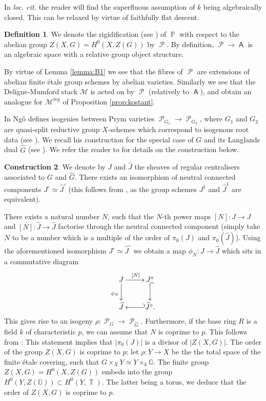 \documentclass{article}
\DeclareMathOperator{\reg}{reg}
\DeclareMathOperator{\A}{\mathsf{A}}
\newcommand{\Gb}{\mathbb{G}}
\DeclareMathOperator{\Pb}{\mathbb{P}}
\DeclareMathOperator{\Tb}{\mathbb{T}}
\newcommand{\Mc}{\mathcal{M}}
\DeclareMathOperator{\Pc}{\mathcal{P}}
\theoremstyle{definition}
\newtheorem{definition}{Definition}[section]
\newtheorem{construction}[definition]{Construction}
\theoremstyle{plain}
\begin{document}
In \emph{loc. cit.} the reader will find the superfluous assumption of $k$ being algebraically closed. This can be relaxed by virtue of faithfully flat descent.

\begin{definition}\label{defi:Pc}
We denote the rigidification (see \cite[Theorem 5.1.5]{abramovich2003twisted}) of $\Pb$ with respect to the abelian group $Z(X,G)=H^0(X,Z(G))$ by $\Pc$. By definition, $\Pc \to \A$ is an algebraic space with a relative group object structure.
\end{definition}

By virtue of Lemma \ref{lemma:B1} we see that the fibres of $\Pc$ are extensions of abelian finite \'etale group schemes by abelian varieties. Similarly we see that the Deligne-Mumford stack $\Mc$ is acted on by $\Pc$ (relatively to $\A$), and obtain an analogue for $\Mc^{\reg}$ of Proposition \ref{prop:kostant}.

In \cite[Proposition 4.18.1]{MR2653248} Ng\^o defines isogenies between Prym varieties $\Pc_{G_1} \to \Pc_{G_2}$, where $G_1$ and $G_2$ are quasi-split reductive group $X$-schemes which correspond to isogenous root data (see \cite[D\'efinition 1.12.1]{MR2653248}). We recall his construction for the special case of $G$ and its Langlands dual $\widehat{G}$ (see \cite[Exemple 1.12.2]{MR2653248}). We refer the reader to \cite[Proposition 4.18.1]{MR2653248} for details on the construction below.

\begin{construction}\label{const:ngo_isogeny}
We denote by $J$ and $\widehat{J}$ the sheaves of regular centralisers associated to $G$ and $\widehat{G}$. There exists an isomorphism of neutral connected components $J^{\circ} \simeq \widehat{J}^{\circ}$ (this follows from \cite[Proposition 2.4.7]{MR2653248}, as the group schemes $J^1$ and $\widehat{J}^1$ are equivalent).

There exists a natural number $N$, such that the $N$-th power maps $[N]\colon J \to J$ and $[N]\colon \widehat{J} \to \widehat{J}$ factorise through the neutral connected component (simply take $N$ to be a number which is a multiple of the order of $\pi_0(J)$ and $\pi_0(\widehat{J})$). Using the aforementioned isomorphism $J^{\circ} \simeq \widehat{J}^{\circ}$ we obtain a map $\phi_N\colon J \to \widehat{J}$ which sits in a commutative diagram
\[
\xymatrix{
J \ar[r]^{[N]} \ar[d]_{\phi_N} & J^{\circ} \ar@{^(->}[d] \\
\widehat{J} & \widehat{J}^{\circ}. \ar@{_(->}[l]
}
\]
This gives rise to an isogeny  $\rho: \Pc_G \to \Pc_{\widehat{G}}$. Furthermore, if the base ring $R$ is a field $k$ of characteristic $p$, we can assume that $N$ is coprime to $p$. This follows from \cite[Corollaire 2.3.2]{MR2653248}: This statement implies that $|\pi_0(J)|$ is a divisor of $|Z(X,G)|$. The order of the group $Z(X,G)$ is coprime to $p$: let $\rho\colon Y \to X$ be the the total space of the finite \'etale covering, such that $G \times_X Y \simeq Y \times_k \Gb$. The finite group $Z(X,G) = H^0(X,Z(G))$ embeds into the group $H^0(Y,Z(\Gb)) \subset H^0(Y,\Tb)$. The latter being a torus, we deduce that the order of $Z(X,G)$ is coprime to $p$.
\end{construction}
\end{document}

